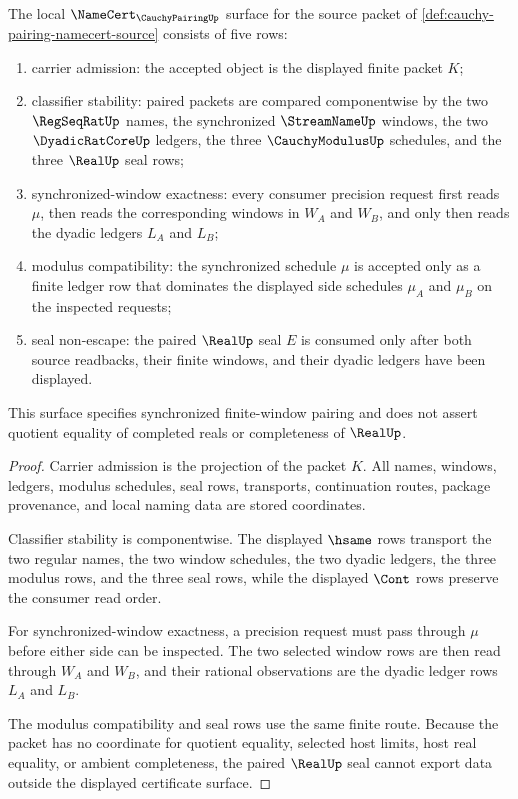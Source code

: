 \begin{theorem}
\label{thm:cauchy-pairing-namecert-obligations}
The local $\NameCert_{\CauchyPairingUp}$ surface for the source packet of \autoref{def:cauchy-pairing-namecert-source} consists of five rows:
\begin{enumerate}
\item carrier admission: the accepted object is the displayed finite packet $K$;
\item classifier stability: paired packets are compared componentwise by the two $\RegSeqRatUp$ names, the synchronized $\StreamNameUp$ windows, the two $\DyadicRatCoreUp$ ledgers, the three $\CauchyModulusUp$ schedules, and the three $\RealUp$ seal rows;
\item synchronized-window exactness: every consumer precision request first reads $\mu$, then reads the corresponding windows in $W_A$ and $W_B$, and only then reads the dyadic ledgers $L_A$ and $L_B$;
\item modulus compatibility: the synchronized schedule $\mu$ is accepted only as a finite ledger row that dominates the displayed side schedules $\mu_A$ and $\mu_B$ on the inspected requests;
\item seal non-escape: the paired $\RealUp$ seal $E$ is consumed only after both source readbacks, their finite windows, and their dyadic ledgers have been displayed.
\end{enumerate}
This surface specifies synchronized finite-window pairing and does not assert quotient equality of completed reals or completeness of $\RealUp$.
\end{theorem}
\begin{proof}
Carrier admission is the projection of the packet $K$. All names, windows, ledgers, modulus schedules, seal rows, transports, continuation routes, package provenance, and local naming data are stored coordinates.

Classifier stability is componentwise. The displayed $\hsame$ rows transport the two regular names, the two window schedules, the two dyadic ledgers, the three modulus rows, and the three seal rows, while the displayed $\Cont$ rows preserve the consumer read order.

For synchronized-window exactness, a precision request must pass through $\mu$ before either side can be inspected. The two selected window rows are then read through $W_A$ and $W_B$, and their rational observations are the dyadic ledger rows $L_A$ and $L_B$.

The modulus compatibility and seal rows use the same finite route. Because the packet has no coordinate for quotient equality, selected host limits, host real equality, or ambient completeness, the paired $\RealUp$ seal cannot export data outside the displayed certificate surface.
\end{proof}

